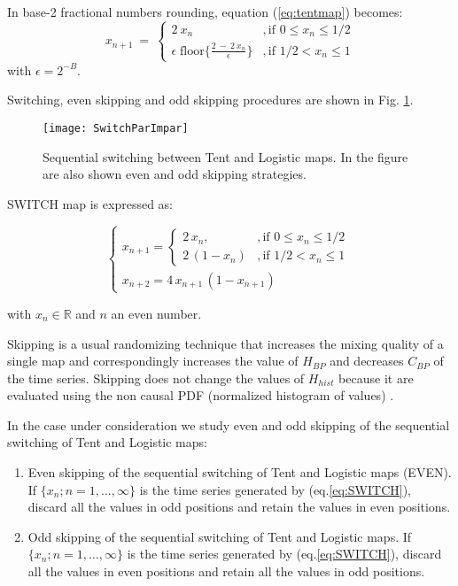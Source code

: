 In base-2 fractional numbers rounding, equation (\ref{eq:tentmap}) becomes:
\begin{equation}\label{eq:tentdecbin}
x_{n+1}~=~ \left\{ \begin{array}{ll}
2~{x_n} &, \textrm{if $0\leq x_n\leq 1/2$}\\
\epsilon \; \text{floor}\{\frac{2~-~2~x_n}{\epsilon}\} &, \textrm{if $1/2<x_n\leq 1$} 
\end{array} \right. 
\end{equation}
with $\epsilon=2^{-B}$.

Switching, even skipping and odd skipping procedures are shown in Fig. \ref{fig:seq}.

\begin{figure}[htpb]
\centering	
	\texttt{[image: SwitchParImpar]}
	\caption{Sequential switching between Tent and Logistic maps. In the figure are also shown even and odd skipping strategies.} \label{fig:seq}
\end{figure}

SWITCH map is expressed as:

\begin{equation}
\begin{cases}
x_{n+1}=
\begin{cases}
2\,x_n, &, \mbox{if } 0\leq x_n\leq 1/2 \\
2\,(1-x_n ) &, \mbox{if } 1/2<x_n\leq 1
\end{cases} \\
x_{n+2}=4\,x_{n+1}\,(1-x_{n+1})
\end{cases}\label{eq:SWITCH}
\end{equation}

\noindent with $x_n \in \mathbb{R}$ and $n$ an even number.

Skipping is a usual randomizing technique that increases the mixing quality of a single map and correspondingly increases the value of $H_{BP}$ and decreases $C_{BP} $ of the time series.
Skipping does not change the values of $H_{hist}$ because it are evaluated using the non causal PDF (normalized histogram of values) \cite{DeMicco2008}.

In the case under consideration we study even and odd skipping of the sequential switching of Tent and Logistic maps:
\begin{enumerate}
	\item Even skipping of the sequential switching of Tent and Logistic maps (EVEN).\\
	If $\{x_n; n=1,\dots,\infty\}$ is the time series generated by (eq.\ref{eq:SWITCH}), discard all the values in odd positions and retain the values in even positions.
	\item Odd skipping of the sequential switching of Tent and Logistic maps.
	If $\{x_n; n=1,\dots,\infty\}$ is the time series generated by (eq.\ref{eq:SWITCH}), discard all the values in even positions and retain all the values in odd positions.
\end{enumerate}

